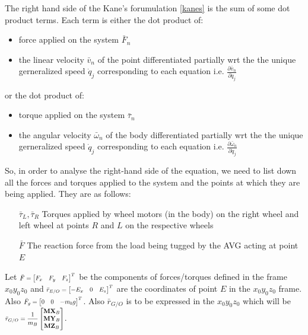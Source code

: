 \documentclass[a4paper,10pt]{article}
\newcommand\scalemath[2]{\scalebox{#1}{\mbox{\ensuremath{\displaystyle #2}}}}
\begin{document}
The right hand side of the Kane's forumulation \ref{kanes} is the sum of some dot product terms. Each term is either the
dot product of:
\begin{itemize}
 \item force applied on the system $\bar{F}_n$
 \item the linear velocity $\bar{v}_n$ of the point differentiated partially wrt the the unique gerneralized speed 
 $\dot{q}_j$ corresponding to each equation i.e. $\frac{\partial \bar{v}_n}{\partial \dot{q}_j}$\\
\end{itemize}
or the dot product of:
\begin{itemize}
 \item torque applied on the system $\bar{\tau}_n$
 \item the angular velocity $\bar{\omega}_n$ of the body differentiated partially wrt the the unique gerneralized speed 
 $\dot{q}_j$ corresponding to each equation i.e. $\frac{\partial \bar{\omega}_n}{\partial \dot{q}_j}$
\end{itemize}

So, in order to analyse the right-hand side of the equation, we need to list down all the forces and torques applied
to the system and the points at which they are being applied. They are as follows:
\begin{itemize}[label={}]
 \item[$\bar\tau_L, \bar\tau_R $] Torques applied by wheel motors (in the body) on the right wheel and left wheel at points 
 $R$ and $L$ on the respective wheels
 \item[$\bar{F}$] The reaction force from the load being tugged by the AVG acting at point $E$
\end{itemize}

Let $\scalemath{0.75}{\bar{F} = \left[\begin{matrix} F_{x} & F_{y} & F_{z} \end{matrix}\right]^T}$
be the components of forces/torques defined in the frame $x_0y_0z_0$ and $\scalemath{0.75}{\bar{r}_{E/O} = \left[\begin{matrix} -E_x & 0 & E_z \end{matrix}\right]^T}$ are the
coordinates of point $E$ in the $x_0y_0z_0$ frame. Also 
$\scalemath{0.75}{\bar{F}_{g} = \left[\begin{matrix} 0 & 0 & -m_bg \end{matrix}\right]^T}$.
Also $\bar{r}_{G/O}$ is to be expressed in the $x_0y_0z_0$ which will be
$\scalemath{0.75}{\bar{r}_{G/O} = \frac{1}{m_B} \left[\begin{matrix} \mathbf{MX}_{B} \\ \mathbf{MY}_{B} \\ \mathbf{MZ}_{B} \end{matrix}\right]}$.
\end{document}
